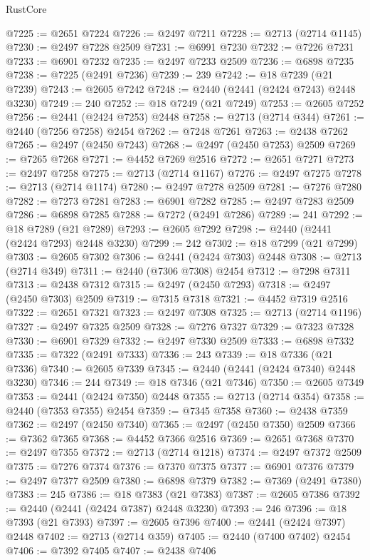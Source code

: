 \begin{lexlean}{RustCore}
\begin{coremodule}
@7225 := @2651 @7224
@7226 := @2497 @7211
@7228 := @2713 (@2714 @1145)
@7230 := @2497 @7228 @2509
@7231 := @6991 @7230
@7232 := @7226 @7231
@7233 := @6901 @7232
@7235 := @2497 @7233 @2509
@7236 := @6898 @7235
@7238 := @7225 (@2491 @7236)
@7239 := 239
@7242 := @18 @7239 (@21 @7239)
@7243 := @2605 @7242
@7248 := @2440 (@2441 (@2424 @7243) @2448 @3230)
@7249 := 240
@7252 := @18 @7249 (@21 @7249)
@7253 := @2605 @7252
@7256 := @2441 (@2424 @7253) @2448
@7258 := @2713 (@2714 @344)
@7261 := @2440 (@7256 @7258) @2454
@7262 := @7248 @7261
@7263 := @2438 @7262
@7265 := @2497 (@2450 @7243)
@7268 := @2497 (@2450 @7253) @2509
@7269 := @7265 @7268
@7271 := @4452 @7269 @2516
@7272 := @2651 @7271
@7273 := @2497 @7258
@7275 := @2713 (@2714 @1167)
@7276 := @2497 @7275
@7278 := @2713 (@2714 @1174)
@7280 := @2497 @7278 @2509
@7281 := @7276 @7280
@7282 := @7273 @7281
@7283 := @6901 @7282
@7285 := @2497 @7283 @2509
@7286 := @6898 @7285
@7288 := @7272 (@2491 @7286)
@7289 := 241
@7292 := @18 @7289 (@21 @7289)
@7293 := @2605 @7292
@7298 := @2440 (@2441 (@2424 @7293) @2448 @3230)
@7299 := 242
@7302 := @18 @7299 (@21 @7299)
@7303 := @2605 @7302
@7306 := @2441 (@2424 @7303) @2448
@7308 := @2713 (@2714 @349)
@7311 := @2440 (@7306 @7308) @2454
@7312 := @7298 @7311
@7313 := @2438 @7312
@7315 := @2497 (@2450 @7293)
@7318 := @2497 (@2450 @7303) @2509
@7319 := @7315 @7318
@7321 := @4452 @7319 @2516
@7322 := @2651 @7321
@7323 := @2497 @7308
@7325 := @2713 (@2714 @1196)
@7327 := @2497 @7325 @2509
@7328 := @7276 @7327
@7329 := @7323 @7328
@7330 := @6901 @7329
@7332 := @2497 @7330 @2509
@7333 := @6898 @7332
@7335 := @7322 (@2491 @7333)
@7336 := 243
@7339 := @18 @7336 (@21 @7336)
@7340 := @2605 @7339
@7345 := @2440 (@2441 (@2424 @7340) @2448 @3230)
@7346 := 244
@7349 := @18 @7346 (@21 @7346)
@7350 := @2605 @7349
@7353 := @2441 (@2424 @7350) @2448
@7355 := @2713 (@2714 @354)
@7358 := @2440 (@7353 @7355) @2454
@7359 := @7345 @7358
@7360 := @2438 @7359
@7362 := @2497 (@2450 @7340)
@7365 := @2497 (@2450 @7350) @2509
@7366 := @7362 @7365
@7368 := @4452 @7366 @2516
@7369 := @2651 @7368
@7370 := @2497 @7355
@7372 := @2713 (@2714 @1218)
@7374 := @2497 @7372 @2509
@7375 := @7276 @7374
@7376 := @7370 @7375
@7377 := @6901 @7376
@7379 := @2497 @7377 @2509
@7380 := @6898 @7379
@7382 := @7369 (@2491 @7380)
@7383 := 245
@7386 := @18 @7383 (@21 @7383)
@7387 := @2605 @7386
@7392 := @2440 (@2441 (@2424 @7387) @2448 @3230)
@7393 := 246
@7396 := @18 @7393 (@21 @7393)
@7397 := @2605 @7396
@7400 := @2441 (@2424 @7397) @2448
@7402 := @2713 (@2714 @359)
@7405 := @2440 (@7400 @7402) @2454
@7406 := @7392 @7405
@7407 := @2438 @7406

\end{coremodule}
\end{lexlean}
